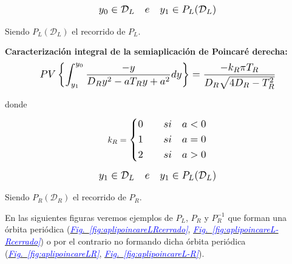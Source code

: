 \documentclass[12pt,a4paper]{report} %
\newcommand{\fref}[1]{\hyperref[#1]{\textcolor{blue}{\textit{Fig.~\ref*{#1}}}}}
\begin{document}
	\vspace{0.5cm}
	
	\begin{equation*}
		\scalebox{1.2}{$\displaystyle
		y_0 \in \mathcal{D}_L \quad e \quad y_1\in P_L(\mathcal{D}_L)
		$}
	\end{equation*}\smallskip
	
	\noindent Siendo $ P_L(\mathcal{D}_L)$ el recorrido de $P_L$.
	
	
	\vspace{2cm}\noindent \textbf{Caracterización integral de la semiaplicación de Poincaré derecha:}
	\begin{equation}
		\label{eq:caracr}
		\scalebox{1.2}{$\displaystyle
			PV\left\{\int_{y_1}^{y_0}\frac{-y}{D_Ry^2-aT_Ry+a^2}dy\right\}=\frac{-k_R\pi T_R}{D_R\sqrt{4D_R-T_R^2}}
			$}
	\end{equation}\smallskip
	
	\noindent donde
	
	\begin{equation*}
		k_R=
		\label{eq:kr}
		\scalebox{1.2}{$\displaystyle
			\left\{
			\begin{aligned}
				0 \qquad si \quad a<0 \\
				1 \qquad si \quad a=0 \\
				2 \qquad si \quad a>0 
			\end{aligned}
			\right. 
			$}
	\end{equation*}\smallskip
	
	\begin{equation*}
		\scalebox{1.2}{$\displaystyle
			y_1 \in \mathcal{D}_L \quad e \quad y_1\in P_L(\mathcal{D}_L)
			$}
	\end{equation*}\smallskip
	
	\noindent Siendo $ P_R(\mathcal{D}_R)$ el recorrido de $P_R$.
	
	\vspace{1cm} En las siguientes figuras veremos ejemplos de $P_L$, $P_R$ y $P_R^{-1}$ que forman una órbita periódica (\fref{fig:aplipoincareLRcerrado}, \fref{fig:aplipoincareL-Rcerrado}) o por el contrario no formando dicha órbita periódica (\fref{fig:aplipoincareLR}, \fref{fig:aplipoincareL-R}).
	
	\newpage
	
\end{document}
